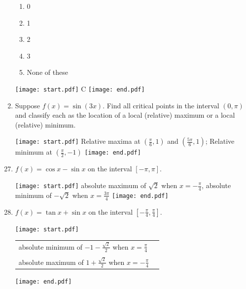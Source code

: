 \documentclass[12pt]{article}
\begin{document}
\begin{enumerate}
\begin{enumerate}

\item 0

\item 1

\item 2

\item 3

\item None of these

\end{enumerate}

\texttt{[image: start.pdf]}
{{C}}
\texttt{[image: end.pdf]}


\newpage

\item Suppose $f(x) = \sin{(3x)}$.  Find all critical points in the interval $(0,\pi)$ and classify each as the location of a local (relative) maximum or a local (relative) minimum. 

\texttt{[image: start.pdf]}
{{Relative maxima at $\left(\frac{\pi}{6},1\right)$ and $\left(\frac{5\pi}{6},1\right)$; Relative minimum at $\left(\frac{\pi}{2},-1\right)$}}
\texttt{[image: end.pdf]}


\end{enumerate}


\begin{enumerate}
\setcounter{enumi}{26}

\item $f(x) = \cos{x}-\sin{x}$ on the interval $[-\pi,\pi]$. 

\texttt{[image: start.pdf]}
{{absolute maximum of $\sqrt{2}$ when $x=-\frac{\pi}{4}$, absolute minimum of $-\sqrt{2}$ when $x=\frac{3\pi}{4}$}}
\texttt{[image: end.pdf]}


\item $f(x) = \tan{x}+\sin{x}$ on the interval $\left[-\frac{\pi}{4}, \frac{\pi}{4}\right]$. 

\texttt{[image: start.pdf]}
{{\begin{tabular}{ll}
absolute minimum of $-1-\frac{\sqrt{2}}{2}$ when $x=\frac{\pi}{4}$\\
\\
absolute maximum of $1+\frac{\sqrt{2}}{2}$ when $x=-\frac{\pi}{4}$
\end{tabular}
}}
\texttt{[image: end.pdf]}


\end{enumerate}
\end{document}
